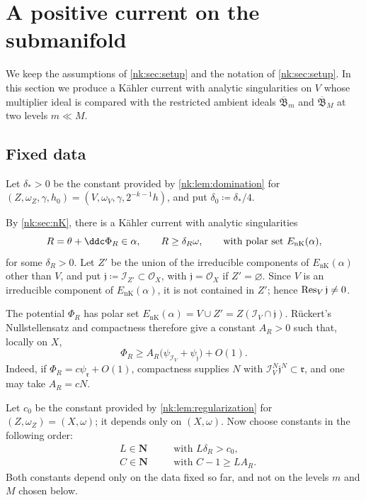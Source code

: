 \section{A positive current on the submanifold}\label{nk:sec:positive-current}

We keep the assumptions of \cref{nk:sec:setup} and the notation of \cref{nk:sec:setup}. In this section
we produce a K\"ahler current with analytic singularities on $V$ whose
multiplier ideal is compared with the restricted ambient ideals
$\overline{\mathfrak B}_m$ and $\overline{\mathfrak B}_M$ at two levels $m\ll M$.

\subsection{Fixed data}\label{nk:sec:fixed-data}

Let $\delta_*>0$ be the constant provided by \cref{nk:lem:domination}
for $(Z,\omega_Z,\gamma,h_0)=(V,\omega_V,\gamma,2^{-k-1}h)$, and put
$\delta_0\coloneqq \delta_*/4$.

By \cref{nk:sec:nK}, there is a K\"ahler current with analytic singularities
\begin{equation}\label{nk:eq:def-R}
  R=\theta+\ddc\Phi_R\in\alpha,\qquad R\ge\delta_R\omega,\qquad
  \text{with polar set }{E_{\mathrm{nK}}}(\alpha),
\end{equation}
for some $\delta_R>0$. Let $Z'$ be the union of the irreducible
components of ${E_{\mathrm{nK}}}(\alpha)$ other than $V$, and put
$\mathfrak j\coloneqq \mathcal I_{Z'}\subset\mathcal O_X$,
with $\mathfrak j=\mathcal O_X$ if $Z'=\varnothing$. Since $V$ is an
irreducible component of ${E_{\mathrm{nK}}}(\alpha)$, it is not contained in $Z'$;
hence $\operatorname{Res}_{V}\mathfrak j\ne0$.

The potential $\Phi_R$ has polar set
${E_{\mathrm{nK}}}(\alpha)=V\cup Z'=Z(\mathcal I_V\cap\mathfrak j)$. R\"uckert's
Nullstellensatz \cite[Chapter~II, Theorem~4.22]{DemCADG} and compactness therefore give
a constant $A_R>0$ such that, locally on $X$,
\begin{equation}\label{nk:eq:PhiR-lower}
  \Phi_R\ge A_R\bigl(\psi_{\mathcal I_V}+\psi_{\mathfrak j}\bigr)+O(1).
\end{equation}
Indeed, if $\Phi_R=c\psi_{\mathfrak r}+O(1)$, compactness supplies
$N$ with $\mathcal I_V^N\mathfrak j^N\subset\mathfrak r$, and one may
take $A_R=cN$.

Let $c_0$ be the constant provided by \cref{nk:lem:regularization} for
$(Z,\omega_Z)=(X,\omega)$; it depends only on $(X,\omega)$. Now
choose constants in the following order:
\begin{equation}\label{nk:eq:constants}
  \begin{alignedat}{2}
  &L\in\mathbf N &&\quad\text{with }L\delta_R>c_0,\\
  &C\in\mathbf N &&\quad\text{with }C-1\ge LA_R.
  \end{alignedat}
\end{equation}
Both constants depend only on the data fixed so far, and not on the
levels $m$ and $M$ chosen below.


